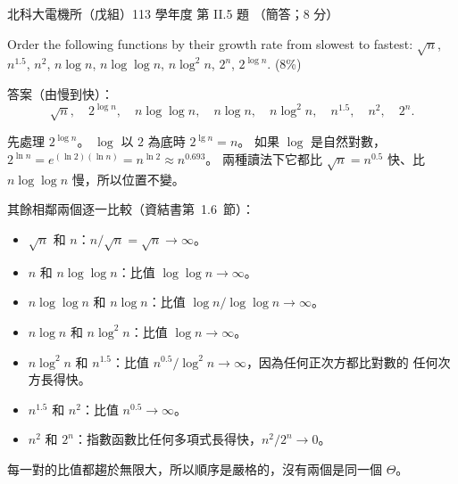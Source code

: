 \begin{pastexam}[label={px:ntut-113-ee-ds-09}]{北科大電機所（戊組）113 學年度 第 II.5 題}
（簡答；8 分）

Order the following functions by their growth rate from slowest to fastest: $\sqrt{n}$, $n^{1.5}$,
$n^2$, $n\log n$, $n\log\log n$, $n\log^2 n$, $2^n$, $2^{\log n}$. (8\%)
\end{pastexam}

\begin{pastsoln}
答案（由慢到快）：
\[
\sqrt{n},\quad 2^{\log n},\quad n \log\log n,\quad n \log n,\quad n \log^2 n,\quad n^{1.5},\quad n^2,\quad 2^n.
\]

先處理 $2^{\log n}$。 $\log$ 以 $2$ 為底時 $2^{\lg n} = n$。 如果 $\log$ 是自然對數，
$2^{\ln n} = e^{(\ln 2)(\ln n)} = n^{\ln 2} \approx n^{0.693}$。 兩種讀法下它都比 $\sqrt{n} = n^{0.5}$
快、比 $n \log\log n$ 慢，所以位置不變。

其餘相鄰兩個逐一比較（資結書第~1.6~節）：
\begin{itemize}
\item $\sqrt{n}$ 和 $n$：$n / \sqrt{n} = \sqrt{n} \to \infty$。
\item $n$ 和 $n \log\log n$：比值 $\log\log n \to \infty$。
\item $n \log\log n$ 和 $n \log n$：比值 $\log n / \log\log n \to \infty$。
\item $n \log n$ 和 $n \log^2 n$：比值 $\log n \to \infty$。
\item $n \log^2 n$ 和 $n^{1.5}$：比值 $n^{0.5} / \log^2 n \to \infty$，因為任何正次方都比對數的
任何次方長得快。
\item $n^{1.5}$ 和 $n^2$：比值 $n^{0.5} \to \infty$。
\item $n^2$ 和 $2^n$：指數函數比任何多項式長得快，$n^2 / 2^n \to 0$。
\end{itemize}
每一對的比值都趨於無限大，所以順序是嚴格的，沒有兩個是同一個 $\Theta$。
\end{pastsoln}
